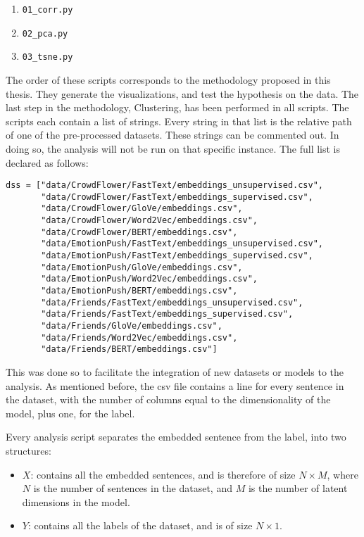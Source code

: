 \begin{enumerate}
  \item \lstinline{01_corr.py}
  \item \lstinline{02_pca.py}
  \item \lstinline{03_tsne.py}
\end{enumerate}

The order of these scripts corresponds to the methodology proposed in this thesis. They generate the visualizations, and test the hypothesis on the data. The last step in the methodology, Clustering, has been performed in all scripts. The scripts each contain a list of strings. Every string in that list is the relative path of one of the pre-processed datasets. These strings can be commented out. In doing so, the analysis will not be run on that specific instance. The full list is declared as follows:

\begin{lstlisting}[caption={Pre-processed datasets},label=lst:datasets,frame=single]
dss = ["data/CrowdFlower/FastText/embeddings_unsupervised.csv",
       "data/CrowdFlower/FastText/embeddings_supervised.csv",
       "data/CrowdFlower/GloVe/embeddings.csv",
       "data/CrowdFlower/Word2Vec/embeddings.csv",
       "data/CrowdFlower/BERT/embeddings.csv",
       "data/EmotionPush/FastText/embeddings_unsupervised.csv",
       "data/EmotionPush/FastText/embeddings_supervised.csv",
       "data/EmotionPush/GloVe/embeddings.csv",
       "data/EmotionPush/Word2Vec/embeddings.csv",
       "data/EmotionPush/BERT/embeddings.csv",
       "data/Friends/FastText/embeddings_unsupervised.csv",
       "data/Friends/FastText/embeddings_supervised.csv",
       "data/Friends/GloVe/embeddings.csv",
       "data/Friends/Word2Vec/embeddings.csv",
       "data/Friends/BERT/embeddings.csv"]
\end{lstlisting}

This was done so to facilitate the integration of new datasets or models to the analysis.
As mentioned before, the csv file contains a line for every sentence in the dataset, with the number of columns equal to the dimensionality of the model, plus one, for the label.

Every analysis script separates the embedded sentence from the label, into two structures:

\begin{itemize}
  \item $X$: contains all the embedded sentences, and is therefore of size $N \times M$, where $N$ is the number of sentences in the dataset, and $M$ is the number of latent dimensions in the model.
  \item $Y$: contains all the labels of the dataset, and is of size $N \times 1$.
\end{itemize}

